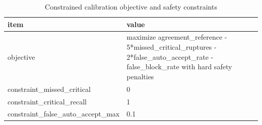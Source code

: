 \begin{table}[h]
\centering
\caption{Constrained calibration objective and safety constraints}
\label{tab:constrained\_calibration}
\begin{tabular}{|l|l|}
\hline
item & value \\
\hline
objective & maximize agreement\_reference - 5*missed\_critical\_ruptures - 2*false\_auto\_accept\_rate - false\_block\_rate with hard safety penalties \\
\hline
constraint\_missed\_critical & 0 \\
\hline
constraint\_critical\_recall & 1 \\
\hline
constraint\_false\_auto\_accept\_max & 0.1 \\
\hline
\end{tabular}
\end{table}
